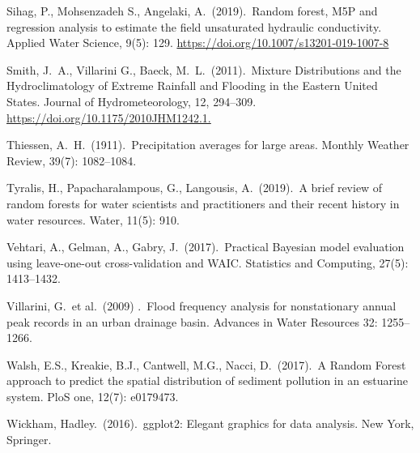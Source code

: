 \begin{thebibliography}{9}
Sihag, P., Mohsenzadeh S.,  Angelaki, A.\ (2019).\ Random forest, M5P and regression analysis to estimate the field unsaturated hydraulic conductivity.
Applied Water Science, 9(5): 129.
\url{https://doi.org/10.1007/s13201-019-1007-8}

Smith, J.\ A., Villarini G., Baeck, M.\ L.\ (2011).\ Mixture Distributions and the Hydroclimatology of Extreme Rainfall and Flooding in the Eastern United States.
Journal of Hydrometeorology, 12, 294--309.
\url{https://doi.org/10.1175/2010JHM1242.1.}

Thiessen, A.\ H.\ (1911).\ Precipitation averages for large areas.
Monthly Weather Review, 39(7): 1082--1084.

Tyralis, H., Papacharalampous, G., Langousis, A.\ (2019).\
A brief review of random forests for water scientists and practitioners and their recent history in water resources.
Water, 11(5): 910.

Vehtari, A., Gelman, A.,  Gabry, J.\ (2017).\
Practical Bayesian model evaluation using leave-one-out cross-validation and WAIC\@.
Statistics and Computing, 27(5): 1413--1432.

Villarini, G.\ et al.\ (2009) .\ Flood frequency analysis for nonstationary annual peak records in an urban drainage basin.
Advances in Water Resources 32: 1255--1266.

Walsh, E.S., Kreakie, B.J., Cantwell, M.G.,  Nacci, D.\ (2017).\
A Random Forest approach to predict the spatial distribution of sediment pollution in an estuarine system.
PloS one, 12(7): e0179473.

\bibitem{ggplot}
Wickham, Hadley.\ (2016).\ ggplot2: Elegant graphics for data analysis.
New York, Springer.

\end{thebibliography}